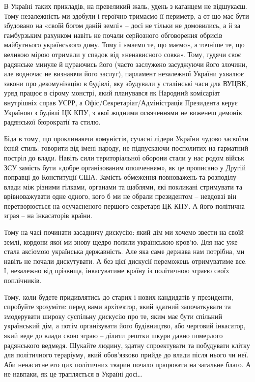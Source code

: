 В Україні таких прикладів, на превеликий жаль, удень з каганцем не відшукаєш.
Тому незалежність ми здобули і героїчно тримаємо її периметр, а от що має бути
збудовано на «своїй богом даній землі» – досі не тільки не домовились, а й за
гамбурзьким рахунком навіть не почали серйозного обговорення обрисів
майбутнього українського дому. Тому і «маємо те, що маємо», а точніше те, що
великою мірою отримали у спадок від «ненависного совка». Тому, гудячи своє
радянське минуле й цураючись його (часто заслужено засуджуючи його злочини, але
водночас не визнаючи його заслуг), парламент незалежної України ухвалює закони
про декомунізацію в будівлі, яку збудували у сталінські часи для ВУЦВК, уряд
працює в сірому монстрі, який планувався як Народний комісаріат внутрішніх
справ УСРР, а Офіс/Секретаріат/Адміністрація Президента керує Україною з
будівлі ЦК КПУ, з якої жодними освяченнями не виженеш демонів радянської
бюрократії та стилю.

Біда в тому, що проклинаючи комуністів, сучасні лідери України чудово засвоїли
їхній стиль: говорити від імені народу, не підпускаючи посполитих на гарматний
постріл до влади. Навіть сили територіальної оборони стали у нас родом військ
ЗСУ замість бути «добре організованим ополченням», як це прописано у Другій
поправці до Конституції США. Замість обмеження повноважень та розподілу влади
між різними гілками, органами та щаблями, які покликані стримувати та
врівноважувати одне одного, кого б ми не обрали президентом – невдовзі він
перетворюється на осучасненого першого секретаря ЦК КПУ. А його політична зграя
– на інкасаторів країни.

Тому на часі починати засадничу дискусію: який дім ми хочемо звести на своїй
землі, кордони якої ми знову щедро полили українською кров’ю. Для нас уже стала
аксіомою українська державність. Але яка саме держава нам потрібна, ми навіть
не почали дискутувати. А без цієї дискусії переможець отримуватиме все. І,
незалежно від прізвища, інкасуватиме країну із політичною зграєю своїх
поплічників.

Тому, коли будете придивлятись до старих і нових кандидатів у президенти,
спробуйте зрозуміти: перед вами архітектор, який здатний започаткувати та
змодерувати широку суспільну дискусію про те, яким має бути спільний
український дім, а потім організувати його будівництво, або черговий інкасатор,
який веде до влади свою зграю – ділити рештки шкури давно померлого радянського
ведмедя. Шукайте людину, здатну спроектувати та побудувати клітку для
політичного тераріуму, який обов’язково прийде до влади після нього чи неї. Аби
ненаситне его цих політичних тварин почало працювати на загальне благо. А не
навпаки, як це трапляється в Україні досі…

